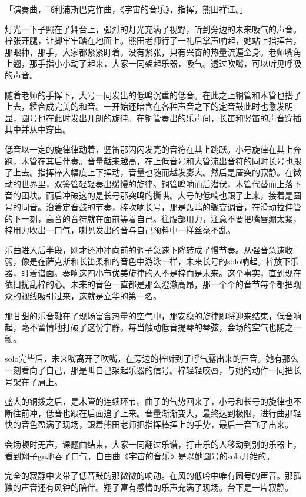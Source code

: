 \documentclass[UTF8]{ctexart}
\begin{document}
    「演奏曲，飞利浦斯巴克作曲，《宇宙的音乐》，指挥，熊田祥江。」

    灯光一下子照在了舞台上，强烈的灯光充满了视野，听到旁边的未来吸气的声音。梓张开腿，让脚牢牢踏在地面上。熊田老师行了一礼后掌声响起，她站上指挥台，那眼神，那手，大家都紧紧盯着。没有紧张，只有兴奋的热量流遍全身。老师嘴角上翘，那手指小小动了起来，大家一同架起乐器，吸气。透过吹嘴，可以听见呼吸的声音。

    随着老师的手挥下，大号一同发出的低鸣沉重的低音。在此之上铜管和木管也搭了上去，糅合成完美的和音。一开始还暗含在各种声音之下的定音鼓此时也愈发明显，圆号也在此时发出开朗的旋律。在铜管奏出的乐声间，长笛和竖笛的声音穿插其中并从中穿出。

    低音以一定的旋律律动着，竖笛那闪闪发亮的音符在其上跳跃。小号旋律在其上奔跑，木管在其后伴奏。音量越来越高，在上低音号和大管流出音符的同时长号也跟了上去。指挥棒大幅度上下挥动，音量也随而越发膨大。然后是唐突的寂静。在微动的世界里，双簧管轻轻奏出缓慢的旋律。铜管鸣响而后潜伏，木管代替而上落下音的团块。而后冲破这的是长号那突鸣的撕哄。大号的低喃也跟了上来，接着是圆号的同音。沿着定音鼓的节奏，梓吹响长号，那是轰鸣的骤变调音，在滑动拉伸管的下一刻，高音的音符就在面前等着自己。往腹部用力，注意不要把嘴唇绷太紧，梓用力吹出一口气，喇叭发出的音与自己预料中一样丝毫不乱。

    乐曲进入后半段，刚才还冲冲向前的调子急速下降转成了慢节奏。从强音急速收弱，像是在萨克斯和长笛柔和的音色中游泳一样，未来长号的solo响起。梓放下乐器，盯着谱面。奏响这四小节优美旋律的人不是梓而是未来。这个事实，直到现在依旧扰乱梓的心。未来的音色一直都是那么澄澈高昂，那一个个的音节每个都把观众的视线吸引过来，这就是立华的第一名。

    那甘甜的乐音融在了现场富含热量的空气中，那安稳的旋律即将迎来结束，低音响起，毫不留情地打破了这份宁静。每当触动低音提琴的琴弦，会场的空气也随之一颤。

    solo完毕后，未来嘴离开了吹嘴，在旁边的梓听到了呼气露出来的声音。她有那么一刻看向了自己，那是叫自己架起乐器的信号。梓轻轻咬唇，与她的动作一同把长号架在了肩上。

    盛大的铜拨之后，是木管的连续环节。曲子的气势回来了，小号和长号的旋律也不断往前冲，低音也跟在后面追了上来。音量渐渐变大，最终达到极限，进行曲那轻快的音色盈满了现场，跟着熊田老师把指挥棒挥上的手势，最后一音飞了出来。

    会场顿时无声，课题曲结束，大家一同翻过乐谱，打击乐的人移动到别的乐器上，看到翔子gu地吞了口气，自由曲《宇宙的音乐》是以她圆号的solo开始的。

    完全的寂静中夹带了低音鼓的那微微的响动。在风的低吟中唯有圆号的声音。那孤独的声音还有风钟的陪伴。翔子富有感情的乐声充满了现场。台下是一片寂静。
\end{document}
